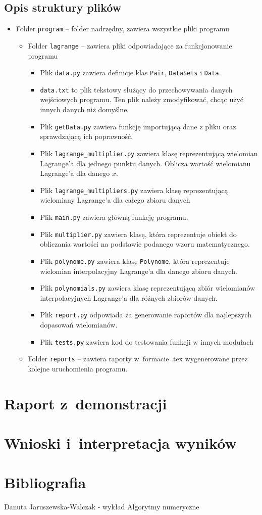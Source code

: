 \documentclass[12pt]{article}
\begin{document}
\subsection{Opis struktury plików}
\begin{itemize}
    \item Folder \verb|program| – folder nadrzędny, zawiera wszystkie pliki programu
    \begin{itemize}
        \item Folder \verb|lagrange| – zawiera pliki odpowiadające za funkcjonowanie programu
        \begin{itemize}
            \item Plik \verb|data.py| zawiera definicje klas \verb|Pair|, \verb|DataSets| i \verb|Data|.
            \item \verb|data.txt| to plik tekstowy służący do przechowywania danych wejściowych programu. Ten plik należy zmodyfikować, chcąc użyć innych danych niż domyślne.
            \item Plik \verb|getData.py| zawiera funkcję importującą dane z pliku oraz sprawdzającą ich poprawność.
            \item Plik \verb|lagrange_multiplier.py| zawiera klasę reprezentującą wielomian Lagrange'a dla jednego punktu danych. Oblicza wartość wielomianu Lagrange'a dla danego $x$.
            \item Plik \verb|lagrange_multipliers.py| zawiera klasę reprezentującą wielomiany Lagrange'a dla całego zbioru danych
            \item Plik \verb|main.py| zawiera główną funkcję programu.
            \item Plik \verb|multiplier.py| zawiera klasę, która reprezentuje obiekt do obliczania wartości na podstawie podanego wzoru matematycznego.
            \item Plik \verb|polynome.py| zawiera klasę \verb|Polynome|, która reprezentuje wielomian interpolacyjny Lagrange'a dla danego zbioru danych.
            \item Plik \verb|polynomials.py| zawiera klasę reprezentującą zbiór wielomianów interpolacyjnych Lagrange'a dla różnych zbiorów danych.
            \item Plik \verb|report.py| odpowiada za generowanie raportów dla najlepszych dopasowań wielomianów.
            \item Plik \verb|tests.py| zawiera kod do testowania funkcji w innych modułach
        \end{itemize}
        \item Folder \verb|reports| – zawiera raporty w~formacie .tex wygenerowane przez kolejne uruchomienia programu.
    \end{itemize}
\end{itemize}

\section{Raport z~demonstracji}

\section{Wnioski i~interpretacja wyników}

\section*{Bibliografia}
Danuta Jaruszewska-Walczak - wykład Algorytmy numeryczne
\end{document}
